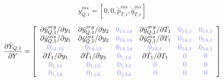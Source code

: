 \documentclass[a4paper,10pt]{article}
\begin{document}
\begin{equation}
\dot{y}_{Q,i}^{ins} = [0, 0, \ddot{\bar{p}}_{T,i}^{ins}, \ddot{\bar{q}}_{T,i}^{ins}]
\end{equation}

\begin{equation}
\frac{\partial\dot{Y}_{Q,1}}{\partial Y}=
\left[ \begin{array}{cccccc}
\partial\dot{y}_{Q,1}^{org} / \partial y_1 & \partial\dot{y}_{Q,1}^{org} / \partial y_2 & \zm{14,14} & \partial\dot{y}_{Q,1}^{org} / \partial T_1 & \zm{14,1} & \zm{14,1} \\
\partial\dot{y}_{Q,1}^{ins} / \partial y_1 & \partial\dot{y}_{Q,1}^{ins} / \partial y_2 & \zm{14,14} & \partial\dot{y}_{Q,1}^{ins} / \partial T_1 & \zm{14,1} & \zm{14,1} \\
\zm{14,14}                                 & \zm{14,14}                                 & \zm{14,14} & \zm{14,1}                                  & \zm{14,1} & \zm{14,1} \\
\partial\dot{T}_1 / \partial y_1           & \partial\dot{T}_1 / \partial y_2           & \zm{1,14}  & \partial\dot{T}_1 / \partial T_1           & \zm{}     & \zm{} \\
\zm{1,14}                                  & \zm{1,14}                                  & \zm{1,14}  & \zm{}                                      & \zm{}     & \zm{} \\
\zm{1,14}                                  & \zm{1,14}                                  & \zm{1,14}  & \zm{}                                      & \zm{}     & \zm{} \\
\end{array}  \right]
\end{equation}
\end{document}
